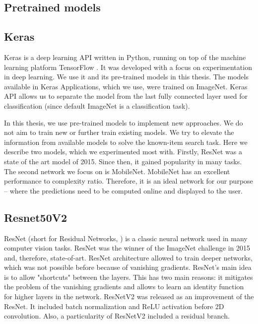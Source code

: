 \subsection{Pretrained models}
\label{ss:pretrained_models}

\subsection{Keras}

Keras \citep{chollet2015keras} is a deep learning API written in Python, running on top of the machine learning platform TensorFlow \citep{tensorflow2015-whitepaper}. It was developed with a focus on experimentation in deep learning. We use it and its pre-trained models in this thesis. The models available in Keras Applications, which we use, were trained on ImageNet. Keras API allows us to separate the model from the last fully connected layer used for classification (since default ImageNet is a classification task). 

In this thesis, we use pre-trained models to implement new approaches. We do not aim to train new or further train existing models. We try to elevate the information from available models to solve the known-item search task. Here we describe two models, which we experimented most with. Firstly, ResNet was a state of the art model of 2015. Since then, it gained popularity in many tasks. The second network we focus on is MobileNet. MobileNet has an excellent performance to complexity ratio. Therefore, it is an ideal network for our purpose -- where the predictions need to be computed online and displayed to the user.

\subsection*{Resnet50V2}

ResNet (short for Residual Networks, \cite{resnet}) is a classic neural network used in many computer vision tasks. ResNet was the winner of the ImageNet challenge in 2015 and, therefore, state-of-art. ResNet architecture allowed to train deeper networks, which was not possible before because of vanishing gradients. ResNet's main idea is to allow "shortcuts" between the layers. This has two main reasons: it mitigates the problem of the vanishing gradients and allows to learn an identity function for higher layers in the network. ResNetV2 \citep{resnetv2} was released as an improvement of the ResNet. It included batch normalization and ReLU activation before 2D convolution. Also, a particularity of ResNetV2 included a residual branch.

